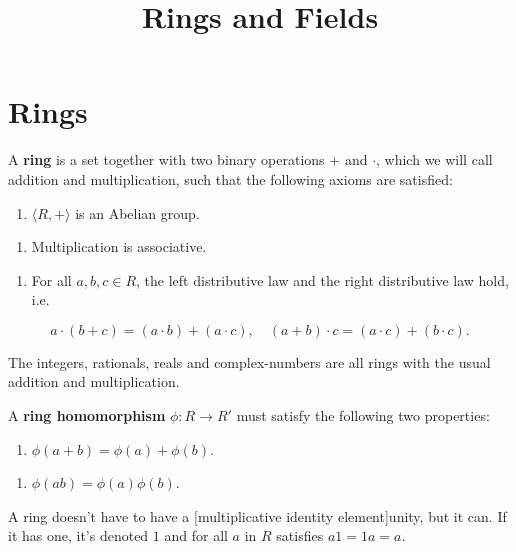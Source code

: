 \documentclass{article}
\title{Rings and Fields}
\begin{document}
\section{Rings}

\begin{definition}[Ring]
A \textbf{ring} is a \@{set} together with two binary operations $+$ and $\cdot$, which we will call addition and multiplication, such that the following axioms are satisfied:

\begin{enumerate}
\item $\langle R, + \rangle$ is an \@{Abelian} \@{group}.
\end{enumerate}

\begin{enumerate}
\item Multiplication is associative.
\end{enumerate}

\begin{enumerate}
\item For all $a,b,c \in R$, the left distributive law and the right distributive law hold, i.e.
\end{enumerate}

\[ a \cdot (b + c) = (a \cdot b) + (a \cdot c), \quad (a + b) \cdot c = (a \cdot c) + (b \cdot c). \]
\end{definition}

\begin{example}
The \@{integers}, \@{rationals}, \@{reals} and \@{complex-numbers} are all \@{rings} with the usual addition and multiplication.
\end{example}

\begin{definition}
A \textbf{ring homomorphism} $\phi : R \to R'$ must satisfy the following two properties:

\begin{enumerate}
\item $\phi{(a+b)} = \phi{(a)} + \phi{(b)}.$ 
\end{enumerate}

\begin{enumerate}
\item $\phi{(ab)} = \phi{(a)}\phi{(b)}.$
\end{enumerate}
\end{definition}

\begin{remark}\label{ring-multiplicative-identity}
A \@{ring} doesn't have to have a \@[multiplicative identity element]{unity}, but it can. If it has one, it's denoted $1$ and for all $a$ in $R$ satisfies $a1 = 1a = a$.
\end{remark}
\end{document}
